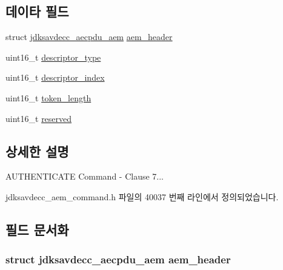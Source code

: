 \subsection*{데이타 필드}
\begin{DoxyCompactItemize}
\item 
struct \hyperlink{structjdksavdecc__aecpdu__aem}{jdksavdecc\+\_\+aecpdu\+\_\+aem} \hyperlink{structjdksavdecc__aem__command__authenticate_ae1e77ccb75ff5021ad923221eab38294}{aem\+\_\+header}
\item 
uint16\+\_\+t \hyperlink{structjdksavdecc__aem__command__authenticate_ab7c32b6c7131c13d4ea3b7ee2f09b78d}{descriptor\+\_\+type}
\item 
uint16\+\_\+t \hyperlink{structjdksavdecc__aem__command__authenticate_a042bbc76d835b82d27c1932431ee38d4}{descriptor\+\_\+index}
\item 
uint16\+\_\+t \hyperlink{structjdksavdecc__aem__command__authenticate_a97da4c134a2723b8dbcd1c88d8577991}{token\+\_\+length}
\item 
uint16\+\_\+t \hyperlink{structjdksavdecc__aem__command__authenticate_a5a6ed8c04a3db86066924b1a1bf4dad3}{reserved}
\end{DoxyCompactItemize}


\subsection{상세한 설명}
A\+U\+T\+H\+E\+N\+T\+I\+C\+A\+TE Command -\/ Clause 7... 

jdksavdecc\+\_\+aem\+\_\+command.\+h 파일의 40037 번째 라인에서 정의되었습니다.



\subsection{필드 문서화}
\subsubsection[{\texorpdfstring{aem\+\_\+header}{aem_header}}]{\setlength{\rightskip}{0pt plus 5cm}struct {\bf jdksavdecc\+\_\+aecpdu\+\_\+aem} aem\+\_\+header}\hypertarget{structjdksavdecc__aem__command__authenticate_ae1e77ccb75ff5021ad923221eab38294}{}\label{structjdksavdecc__aem__command__authenticate_ae1e77ccb75ff5021ad923221eab38294}


